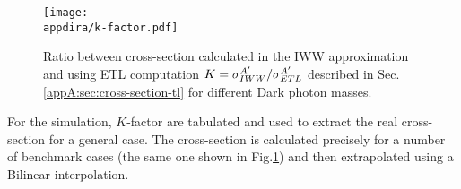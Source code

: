 \begin{figure}[bth!]
  \centering
  \texttt{[image: \\appdira/k-factor.pdf]}
  \caption{Ratio between cross-section calculated in the IWW approximation and using ETL computation $K = \sigma^{A'}_{IWW} / \sigma^{A'}_{ETL}$ described in Sec.\ref{appA:sec:cross-section-tl} for different Dark photon masses.}
  \label{fig:k-factor}
\end{figure}

For the simulation, $K$-factor are tabulated and used to extract the real cross-section for a general case. The cross-section is calculated precisely for a number of benchmark cases (the same one shown in Fig.\ref{fig:k-factor}) and then extrapolated using a Bilinear interpolation.










